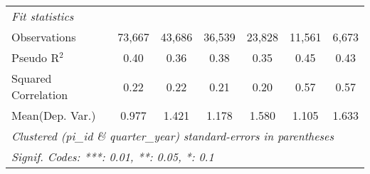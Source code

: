 \begin{tabular}{lcccccc}
   \midrule
   \emph{Fit statistics}\\
   Observations                                               & 73,667        & 43,686        & 36,539       & 23,828        & 11,561  & 6,673\\  
   Pseudo R$^2$                                               & 0.40          & 0.36          & 0.38         & 0.35          & 0.45    & 0.43\\  
   Squared Correlation                                        & 0.22          & 0.22          & 0.21         & 0.20          & 0.57    & 0.57\\  
Mean(Dep. Var.) & 0.977 & 1.421 & 1.178 & 1.580 & 1.105 & 1.633 \\
   \midrule \midrule
   \multicolumn{7}{l}{\emph{Clustered (pi\_id \& quarter\_year) standard-errors in parentheses}}\\
   \multicolumn{7}{l}{\emph{Signif. Codes: ***: 0.01, **: 0.05, *: 0.1}}\\
\end{tabular}
\par\endgroup
